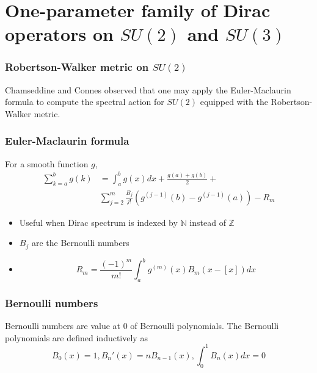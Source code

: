 \documentclass{beamer}
\def\N{{\mathbb N}}
\def\Z{{\mathbb Z}}
\begin{document}
\section{One-parameter family of Dirac operators on $SU(2)$ and $SU(3)$}

\begin{frame}
  \frametitle{Robertson-Walker metric on $SU(2)$}
  \begin{block}{}
    Chamseddine and Connes observed that one may apply the Euler-Maclaurin formula to compute the spectral action for $SU(2)$ equipped with the Robertson-Walker metric.
  \end{block}
\end{frame}

\begin{frame}
  \frametitle{Euler-Maclaurin formula}
  \begin{block}{}
    For a smooth function $g$,
    \begin{align*}
      \sum_{k=a}^b g(k) &= \int_a^b g(x) dx + \frac{g(a) + g(b)}{2} +  \\
      & \sum_{j=2}^m \frac{B_j}{j!}(g^{(j-1)}(b) - g^{(j-1)}(a)) - R_m
    \end{align*}
  \end{block}

  \pause

  \begin{block}{}
    \begin{itemize}
      \item Useful when Dirac spectrum is indexed by $\N$ instead of $\Z$
      \item $B_j$ are the Bernoulli numbers
      \item \[
        R_m = \frac{(-1)^m}{m!} \int_a^b g^{(m)}(x) B_m (x-[x])dx
      \]
    \end{itemize}
  \end{block}
\end{frame}

\begin{frame}
  \frametitle{Bernoulli numbers}
  Bernoulli numbers are value at 0 of Bernoulli polynomials. The Bernoulli polynomials are defined inductively as
  \[
    B_0(x) = 1, B_n'(x) = nB_{n-1}(x), \int_0^1 B_n(x)dx = 0
  \]
\end{frame}
\end{document}
